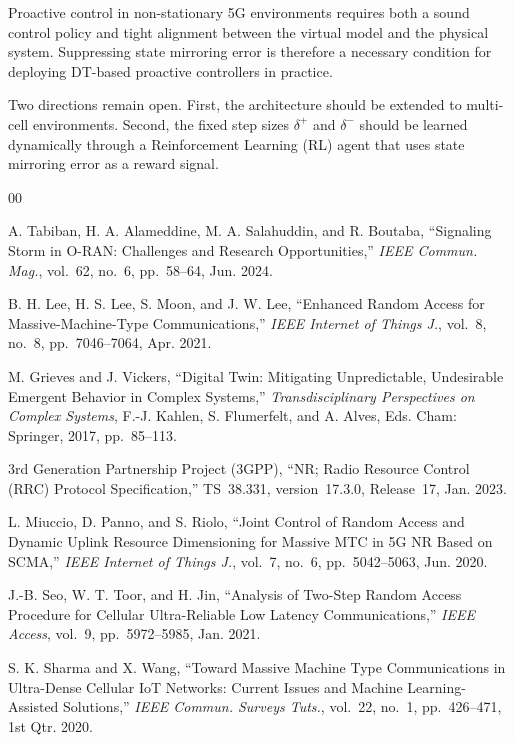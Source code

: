 \documentclass[conference]{IEEEtran}
\begin{document}
Proactive control in non-stationary 5G environments requires both a sound control policy and tight alignment between the virtual model and the physical system. Suppressing state mirroring error is therefore a necessary condition for deploying DT-based proactive controllers in practice.

Two directions remain open. First, the architecture should be extended to multi-cell environments. Second, the fixed step sizes $\delta^{+}$ and $\delta^{-}$ should be learned dynamically through a Reinforcement Learning (RL) agent that uses state mirroring error as a reward signal.

\begin{thebibliography}{00}

A. Tabiban, H. A. Alameddine, M. A. Salahuddin, and R. Boutaba,
``Signaling Storm in O-RAN: Challenges and Research Opportunities,''
\emph{IEEE Commun. Mag.},
vol.~62, no.~6, pp.~58--64, Jun. 2024.

B. H. Lee, H. S. Lee, S. Moon, and J. W. Lee,
``Enhanced Random Access for Massive-Machine-Type Communications,''
\emph{IEEE Internet of Things J.},
vol.~8, no.~8, pp.~7046--7064, Apr. 2021.

M. Grieves and J. Vickers,
``Digital Twin: Mitigating Unpredictable, Undesirable Emergent Behavior in
Complex Systems,''
\emph{Transdisciplinary Perspectives on Complex Systems},
F.-J. Kahlen, S. Flumerfelt, and A. Alves, Eds.
Cham: Springer, 2017, pp.~85--113.

3rd Generation Partnership Project (3GPP),
``NR; Radio Resource Control (RRC) Protocol Specification,''
TS~38.331, version~17.3.0, Release~17, Jan. 2023.

L. Miuccio, D. Panno, and S. Riolo,
``Joint Control of Random Access and Dynamic Uplink Resource Dimensioning
for Massive MTC in 5G NR Based on SCMA,''
\emph{IEEE Internet of Things J.},
vol.~7, no.~6, pp.~5042--5063, Jun. 2020.

J.-B. Seo, W. T. Toor, and H. Jin,
``Analysis of Two-Step Random Access Procedure for Cellular Ultra-Reliable Low Latency Communications,''
\emph{IEEE Access},
vol.~9, pp.~5972--5985, Jan. 2021.

S. K. Sharma and X. Wang,
``Toward Massive Machine Type Communications in Ultra-Dense Cellular IoT
Networks: Current Issues and Machine Learning-Assisted Solutions,''
\emph{IEEE Commun. Surveys Tuts.},
vol.~22, no.~1, pp.~426--471, 1st Qtr. 2020.


\end{thebibliography}
\end{document}
